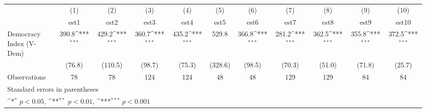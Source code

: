 {
\def\sym#1{\ifmmode^{#1}\else\(^{#1}\)\fi}
\begin{tabular}{l*{10}{c}}
\hline\hline
                    &\multicolumn{1}{c}{(1)}         &\multicolumn{1}{c}{(2)}         &\multicolumn{1}{c}{(3)}         &\multicolumn{1}{c}{(4)}         &\multicolumn{1}{c}{(5)}         &\multicolumn{1}{c}{(6)}         &\multicolumn{1}{c}{(7)}         &\multicolumn{1}{c}{(8)}         &\multicolumn{1}{c}{(9)}         &\multicolumn{1}{c}{(10)}         \\
                    &        est1         &        est2         &        est3         &        est4         &        est5         &        est6         &        est7         &        est8         &        est9         &       est10         \\
\hline
Democracy Index (V-Dem)&       390.8\sym{***}&       429.2\sym{***}&       360.7\sym{***}&       435.2\sym{***}&       529.8         &       366.8\sym{***}&       281.2\sym{***}&       362.5\sym{***}&       355.8\sym{***}&       372.5\sym{***}\\
                    &      (76.8)         &     (110.5)         &      (98.7)         &      (75.3)         &     (328.6)         &      (98.5)         &      (70.3)         &      (51.0)         &      (71.8)         &      (25.7)         \\
\hline
Observations        &          78         &          78         &         124         &         124         &          48         &          48         &         129         &         129         &          84         &          84         \\
\hline\hline
\multicolumn{11}{l}{\footnotesize Standard errors in parentheses}\\
\multicolumn{11}{l}{\footnotesize \sym{*} \(p<0.05\), \sym{**} \(p<0.01\), \sym{***} \(p<0.001\)}\\
\end{tabular}
}
